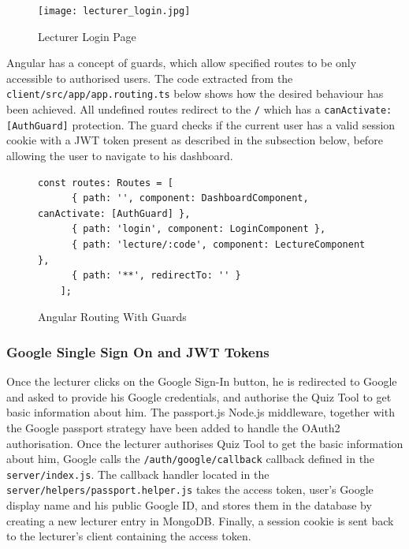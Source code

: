 \begin{figure}[h!]
    \centering
    \texttt{[image: lecturer\_login.jpg]}
    \caption{Lecturer Login Page}
    \label{fig:lecturerlogin}
\end{figure}

Angular has a concept of guards, which allow specified routes to be only accessible to
authorised users. The code extracted from the \texttt{client/src/app/app.routing.ts} below
shows how the desired behaviour has been achieved. All undefined routes redirect to the \texttt{/}
which has a \texttt{canActivate: [AuthGuard]} protection. The guard checks if the current user has a
valid session cookie with a JWT token\cite{44} present as described in the subsection below, before allowing
the user to navigate to his dashboard.

\begin{figure}[h!]
    \begin{lstlisting}[basicstyle=\small]
    const routes: Routes = [
      { path: '', component: DashboardComponent, canActivate: [AuthGuard] },
      { path: 'login', component: LoginComponent },
      { path: 'lecture/:code', component: LectureComponent },
      { path: '**', redirectTo: '' }
    ];
    \end{lstlisting}
    \caption{Angular Routing With Guards}
    \label{fig:auth}
\end{figure}

\subsubsection{Google Single Sign On and JWT Tokens}
\label{subsection:google}
Once the lecturer clicks on the Google Sign-In button, he is redirected to Google
and asked to provide his Google credentials, and authorise the Quiz Tool to get
basic information about him. The passport.js\cite{45} Node.js middleware, together
with the Google passport strategy\cite{46} have been added to handle the OAuth2\cite{47} authorisation.
Once the lecturer authorises Quiz Tool to get the basic information about him, Google calls the
\texttt{/auth/google/callback} callback defined in the \texttt{server/index.js}. The callback
handler located in the \texttt{server/helpers/passport.helper.js} takes the access token, user's
Google display name and his public Google ID, and stores them in the database by creating a new
lecturer entry in MongoDB. Finally, a session cookie is sent back to the lecturer's client
containing the access token.

